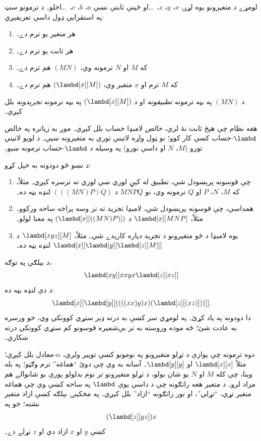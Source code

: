 \documentclass[../../../include/open-logic-section]{subfiles}
\begin{document}

لومړے د متغيرونو يوه لړۍ $x$، $y$، $z$،~\dots او ځينې ثابتې نښې
$a$، $b$، $c$،~\dots اخلو۔ د ترمونو سټ په استقرايي ډول داسې
تعريفېږي:
\begin{enumerate}
\item هر متغير يو ترم دے۔
\item هر ثابت يو ترم دے۔
\item که $M$ او $N$ ترمونه وي، $(MN)$ هم ترم دے۔
\item که $M$ ترم او $x$ متغير وي، $(\lambd[x][M])$ هم ترم دے۔
\end{enumerate}
د $(MN)$ په بڼه ترمونه \emph{تطبيقونه} او د
$(\lambd[x][M])$ په بڼه ترمونه \emph{تجريدونه} بلل کېږي۔

هغه نظام چې هېڅ ثابت نۀ لري، \emph{خالص} لامبډا حساب بلل کېږي۔ موږ به
زياتره په خالص $\lambd$-حساب کښې کار کوو؛ نو ټول واړه لاتيني توري
به متغيرونه ښيي۔ د لويو لاتيني تورو ($M$، $N$ او داسې نورو) په وسيله
د $\lambd$-حساب ترمونه ښيو۔

د نښو څو دودونه به خپل کړو:

\begin{conv}
\begin{enumerate}
\item چې قوسونه پرېښودل شي، تطبيق له کيڼ لوري ښي لوري ته ترسره کېږي۔
  مثلاً، که $M$، $N$، $P$ او $Q$ ترمونه وي، نو $MNPQ$ د
  $(((MN)P)Q)$ لنډه بڼه ده۔
\item همداسې، چې قوسونه پرېښودل شي، لامبډا تجريد ته تر وسه پراخه
  ساحه ورکوو۔ مثلاً، $\lambd[x][MNP]$ د
  $(\lambd[x][((MN)P)])$ په معنا لولو۔
\item يوه لامبډا د څو متغيرونو د تجريد دپاره کارېدے شي۔ مثلاً،
  $\lambd[xyz][M]$ د
  $\lambd[x][\lambd[y][\lambd[z][M]]]$ لنډه بڼه ده۔
\end{enumerate}
\end{conv}

د بېلګې په توګه،
\[
\lambd[xy][xxyx \lambd[z][xz]]
\]
د دې لنډه بڼه ده:
\[
\lambd[x][\lambd[y][((((xx)y)x)(\lambd[z][(xz)]))]].
\]
دا دودونه په ياد کړئ۔ په لومړي سر کښې به درته ډېر ستړي کوونکي وي،
خو ورسره به عادت شئ؛ څه موده وروسته به تر بې‌شمېره قوسونو کم ستړي
کوونکي درته ښکاري۔

دوه ترمونه چې يوازې د تړلو متغيرونو په نومونو کښې توپير ولري،
$\alpha$-معادل بلل کېږي؛ مثلاً $\lambd[x][x]$ او
$\lambd[y][y]$۔ آسانه به وي چې دوئ ``هماغه'' ترم وګڼو؛ په بله
وينا، چې کله $M$ او $N$ يو شان بولو، د تړلو متغيرونو تر نوم بدلولو
پورې يو شانوالے هم مراد لرو۔ د متغير هغه راتګونه چې د داسې يوې $\lambd$ په ساحه
کښې وي چې هماغه متغير تړي، ``تړلي''، او نور راتګونه ``ازاد''
بلل کېږي۔ په مخکينۍ بېلګه کښې
ازاد متغير نشته؛ خو په
\[
(\lambd[z][yz])x
\]
کښې $y$ او $x$ ازاد دي او $z$ تړلے دے۔
\end{document}

